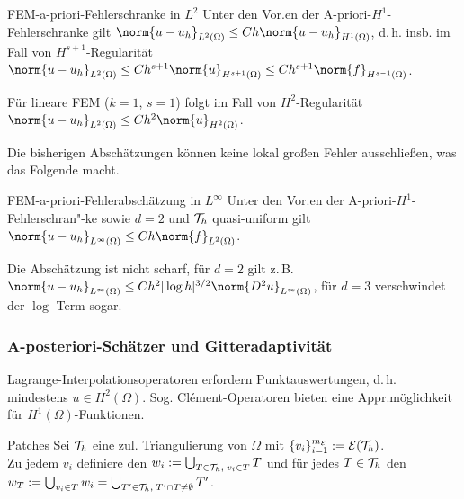 \linie

\begin{Satz}{FEM-a-priori-Fehlerschranke in $L^2$}
    Unter den Vor.en der A-priori-$H^1$-Fehlerschranke gilt
    $\norm{u - u_h}_{L^2(\Omega)} \le Ch \norm{u - u_h}_{H^1(\Omega)}$,
    d.\,h. insb. im Fall von $H^{s+1}$-Regularität\\
    $\norm{u - u_h}_{L^2(\Omega)} \le Ch^{s+1} \norm{u}_{H^{s+1}(\Omega)}
    \le Ch^{s+1} \norm{f}_{H^{s-1}(\Omega)}$.
\end{Satz}

\begin{Bem}
    Für lineare FEM ($k = 1$, $s = 1$) folgt im Fall von $H^2$-Regularität\\
    $\norm{u - u_h}_{L^2(\Omega)} \le Ch^2 \norm{u}_{H^2(\Omega)}$.
\end{Bem}

\begin{Bem}
    Die bisherigen Abschätzungen können keine lokal großen Fehler ausschließen,
    was das Folgende macht.
\end{Bem}

\begin{Satz}{FEM-a-priori-Fehlerabschätzung in $L^\infty$}
    Unter den Vor.en der A-priori-$H^1$-Fehlerschran"-ke sowie
    $d = 2$ und $\mathcal{T}_h$ quasi-uniform gilt
    $\norm{u - u_h}_{L^\infty(\Omega)} \le Ch\norm{f}_{L^2(\Omega)}$.
\end{Satz}

\begin{Bem}
    Die Abschätzung ist nicht scharf, für $d = 2$ gilt z.\,B.\\
    $\norm{u - u_h}_{L^\infty(\Omega)} \le Ch^2 |\log h|^{3/2} \norm{D^2 u}_{L^\infty(\Omega)}$,
    für $d = 3$ verschwindet der $\log$-Term sogar.
\end{Bem}

\subsubsection{%
    A-posteriori-Schätzer und Gitteradaptivität%
}

\begin{Bem}
    Lagrange-Interpolationsoperatoren erfordern Punktauswertungen, d.\,h.
    mindestens $u \in H^2(\Omega)$.
    Sog. Clément-Operatoren bieten eine Appr.möglichkeit für $H^1(\Omega)$-Funktionen.
\end{Bem}

\begin{Def}{Patches}
    Sei $\mathcal{T}_h$ eine zul. Triangulierung von $\Omega$ mit
    $\{v_i\}_{i=1}^{m_{\mathcal{E}}} := \mathcal{E}(\mathcal{T}_h)$.\\
    Zu jedem $v_i$ definiere
    den 
    $w_i := \bigcup_{T \in \mathcal{T}_h,\; v_i \in T} T$ und für jedes $T \in \mathcal{T}_h$
    den 
    $w_T := \bigcup_{v_i \in T} w_i = \bigcup_{T' \in \mathcal{T}_h,\; T' \cap T \not= \emptyset} T'$.
\end{Def}

